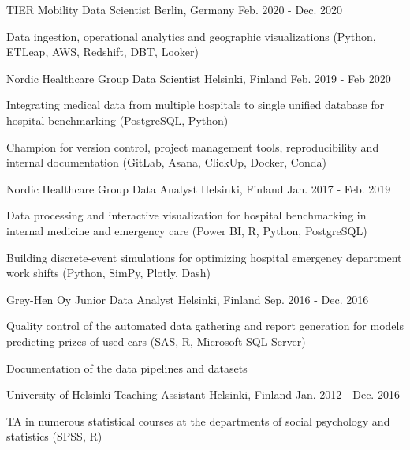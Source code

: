 \begin{cventries}
  \cventry
    {TIER Mobility} %
    {Data Scientist} %
    {Berlin, Germany} %
    {Feb. 2020 - Dec. 2020} %
    {
      \begin{cvitems}
        \item {Data ingestion, operational analytics and geographic
        visualizations (Python, ETLeap, AWS, Redshift, DBT, Looker)}
      \end{cvitems}
    }

  \cventry
    {Nordic Healthcare Group} %
    {Data Scientist} %
    {Helsinki, Finland} %
    {Feb. 2019 - Feb 2020} %
    {
      \begin{cvitems}
        \item {Integrating medical data from multiple hospitals to single unified database for hospital benchmarking
        (PostgreSQL, Python)}
        \item {Champion for version control, project management tools,
        reproducibility and internal documentation (GitLab, Asana, ClickUp, Docker, Conda)}
      \end{cvitems}
    }

  \cventry
    {Nordic Healthcare Group} %
    {Data Analyst} %
    {Helsinki, Finland} %
    {Jan. 2017 - Feb. 2019} %
    {
      \begin{cvitems}
        \item {Data processing and interactive visualization for hospital benchmarking
        in internal medicine and emergency care (Power BI, R, Python, PostgreSQL)}
        \item {Building discrete-event simulations for optimizing hospital emergency department work shifts (Python, SimPy, Plotly, Dash)}
      \end{cvitems}
    }

  \cventry
    {Grey-Hen Oy} %
    {Junior Data Analyst} %
    {Helsinki, Finland} %
    {Sep. 2016 - Dec. 2016} %
    {
      \begin{cvitems}
        \item {Quality control of the automated data gathering and report generation
        for models predicting prizes of used cars (SAS, R, Microsoft SQL Server)}
        \item {Documentation of the data pipelines and datasets}
      \end{cvitems}
    }

  \cventry
    {University of Helsinki} %
    {Teaching Assistant} %
    {Helsinki, Finland} %
    {Jan. 2012 - Dec. 2016} %
    {
      \begin{cvitems}
        \item {TA in numerous statistical courses at the departments of social
        psychology and statistics (SPSS, R)}
      \end{cvitems}
    }


\end{cventries}
